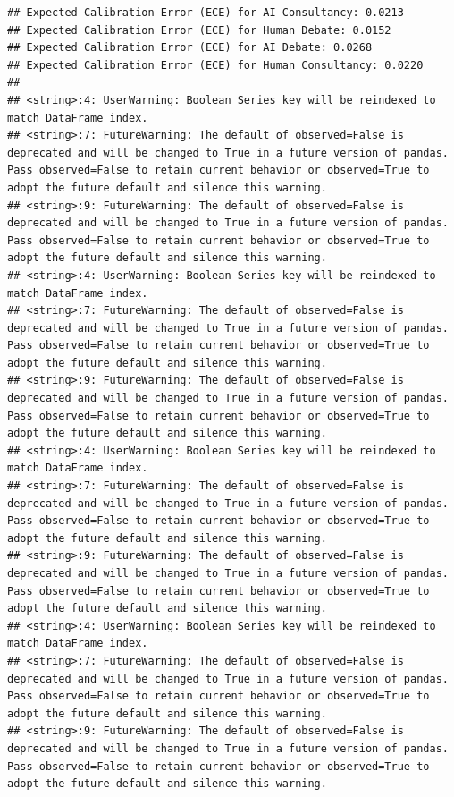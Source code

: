 \documentclass[
]{article}
\begin{document}
\begin{verbatim}
## Expected Calibration Error (ECE) for AI Consultancy: 0.0213
## Expected Calibration Error (ECE) for Human Debate: 0.0152
## Expected Calibration Error (ECE) for AI Debate: 0.0268
## Expected Calibration Error (ECE) for Human Consultancy: 0.0220
## 
## <string>:4: UserWarning: Boolean Series key will be reindexed to match DataFrame index.
## <string>:7: FutureWarning: The default of observed=False is deprecated and will be changed to True in a future version of pandas. Pass observed=False to retain current behavior or observed=True to adopt the future default and silence this warning.
## <string>:9: FutureWarning: The default of observed=False is deprecated and will be changed to True in a future version of pandas. Pass observed=False to retain current behavior or observed=True to adopt the future default and silence this warning.
## <string>:4: UserWarning: Boolean Series key will be reindexed to match DataFrame index.
## <string>:7: FutureWarning: The default of observed=False is deprecated and will be changed to True in a future version of pandas. Pass observed=False to retain current behavior or observed=True to adopt the future default and silence this warning.
## <string>:9: FutureWarning: The default of observed=False is deprecated and will be changed to True in a future version of pandas. Pass observed=False to retain current behavior or observed=True to adopt the future default and silence this warning.
## <string>:4: UserWarning: Boolean Series key will be reindexed to match DataFrame index.
## <string>:7: FutureWarning: The default of observed=False is deprecated and will be changed to True in a future version of pandas. Pass observed=False to retain current behavior or observed=True to adopt the future default and silence this warning.
## <string>:9: FutureWarning: The default of observed=False is deprecated and will be changed to True in a future version of pandas. Pass observed=False to retain current behavior or observed=True to adopt the future default and silence this warning.
## <string>:4: UserWarning: Boolean Series key will be reindexed to match DataFrame index.
## <string>:7: FutureWarning: The default of observed=False is deprecated and will be changed to True in a future version of pandas. Pass observed=False to retain current behavior or observed=True to adopt the future default and silence this warning.
## <string>:9: FutureWarning: The default of observed=False is deprecated and will be changed to True in a future version of pandas. Pass observed=False to retain current behavior or observed=True to adopt the future default and silence this warning.
\end{verbatim}
\end{document}

